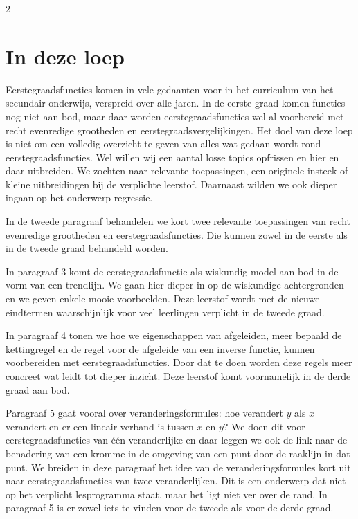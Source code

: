 \begin{multicols}{2}                      
\inhoudstafelLoep		                  %




\section{In deze loep}
Eerstegraadsfuncties komen in vele gedaanten voor in het curriculum van het secundair onderwijs, verspreid over alle jaren. In de eerste graad komen functies nog niet aan bod, maar daar worden eerstegraadsfuncties wel al voorbereid met recht evenredige grootheden en eerstegraadsvergelijkingen. Het doel van deze loep is niet om een volledig overzicht te geven van alles wat gedaan wordt rond eerstegraadsfuncties. Wel willen wij een aantal losse topics opfrissen en hier en daar uitbreiden. We zochten naar relevante toepassingen, een originele insteek of kleine uitbreidingen bij de verplichte leerstof. Daarnaast wilden we ook dieper ingaan op het onderwerp regressie.

In de tweede paragraaf behandelen we kort twee relevante toepassingen van recht evenredige grootheden en eerstegraadsfuncties. Die kunnen zowel in de eerste als in de tweede graad behandeld worden. 

In paragraaf 3 komt de eerstegraadsfunctie als wiskundig model aan bod in de vorm van een trendlijn. We gaan hier dieper in op de wiskundige achtergronden en we geven enkele mooie voorbeelden. Deze leerstof wordt met de nieuwe eindtermen waarschijnlijk voor veel leerlingen verplicht in de tweede graad. 

In paragraaf 4 tonen we hoe we eigenschappen van afgeleiden, meer bepaald de kettingregel en de regel voor de afgeleide van een inverse functie, kunnen voorbereiden met eerstegraadsfuncties. Door dat te doen worden deze regels meer concreet wat leidt tot dieper inzicht. Deze leerstof komt voornamelijk in de derde graad aan bod.

Paragraaf 5 gaat vooral over veranderingsformules: hoe verandert $y$ als $x$ verandert en er een lineair verband is tussen $x$ en $y$? We doen dit voor eerstegraadsfuncties van één veranderlijke en daar leggen we ook de link naar de benadering van een kromme in de omgeving van een punt door de raaklijn in dat punt. We breiden in deze paragraaf het idee van de veranderingsformules kort uit naar eerstegraadsfuncties van twee veranderlijken. Dit is een onderwerp dat niet op het verplicht lesprogramma staat, maar het ligt niet ver over de rand. In paragraaf 5 is er zowel iets te vinden voor de tweede als voor de derde graad. 


\end{multicols}

